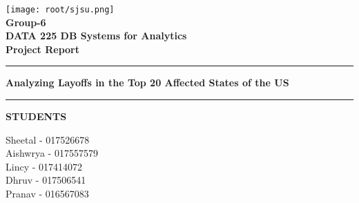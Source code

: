 
\begin{titlepage}
\begin{center}
\vspace{2cm}
\texttt{[image: root/sjsu.png]}~\\[1cm]
\vspace{2cm}
\textbf{\Large Group-6}\\
\vspace{1cm}
\textbf{\Large DATA 225 DB Systems for Analytics} \\
\vspace{1cm}
\textbf{\Large Project Report}
\vspace{2cm}
\hrule
\vspace{.5cm}
{ \huge \bfseries Analyzing Layoffs in the Top 20 Affected States of the US} %
\vspace{.5cm}

\hrule
\vspace{1.5cm}


\textsc{\textbf{STUDENTS}}\\
\vspace{.5cm}
\centering

Sheetal - 017526678\\
Aishwrya - 017557579\\
Lincy - 017414072\\
Dhruv - 017506541\\
Pranav - 016567083\\

\vspace{4cm}


\end{center}
\end{titlepage}